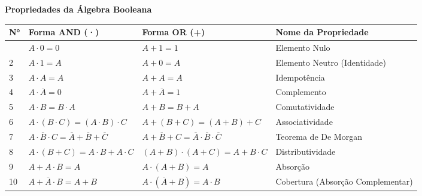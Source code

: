 \documentclass[12pt]{article}
\begin{document}
\begin{center}
  {\Large \textbf{\textcolor{maincolor}{Propriedades da Álgebra Booleana}}}
\end{center}

\vspace{0.5cm}

\begin{center}
\renewcommand{\arraystretch}{1.6}
\begin{tabular}{
  >{\centering\arraybackslash}m{0.5cm}
  >{\centering\arraybackslash}m{4.2cm}
  >{\centering\arraybackslash}m{4.2cm}
  >{\centering\arraybackslash}m{4.5cm}
}
\toprule
\textbf{N°} & \textbf{Forma AND (·)} & \textbf{Forma OR (+)} & \textbf{Nome da Propriedade} \\
\midrule

1 & $A \cdot 0 = 0$ & $A + 1 = 1$ & Elemento Nulo \\
\midrule

2 & $A \cdot 1 = A$ & $A + 0 = A$ & Elemento Neutro (Identidade) \\
\midrule

3 & $A \cdot A = A$ & $A + A = A$ & Idempotência \\
\midrule

4 & $A \cdot \overline{A} = 0$ & $A + \overline{A} = 1$ & Complemento \\
\midrule

5 & $A \cdot B = B \cdot A$ & $A + B = B + A$ & Comutatividade \\
\midrule

6 & $A \cdot (B \cdot C) = (A \cdot B) \cdot C$ & $A + (B + C) = (A + B) + C$ & Associatividade \\
\midrule

7 & $\overline{A \cdot B \cdot C} = \overline{A} + \overline{B} + \overline{C}$ & $\overline{A + B + C} = \overline{A} \cdot \overline{B} \cdot \overline{C}$ & Teorema de De Morgan \\
\midrule

8 & $A \cdot (B + C) = A \cdot B + A \cdot C$ & $(A+B)\cdot(A+C) = A + B \cdot C$ & Distributividade \\
\midrule

9 & $A + A \cdot B = A$ & $A \cdot (A + B) = A$ & Absorção \\
\midrule

10 & $A + \overline{A} \cdot B = A + B$ & $A \cdot (\overline{A} + B) = A \cdot B$ & Cobertura (Absorção Complementar) \\
\midrule


\end{tabular}
\end{center}
\end{document}
